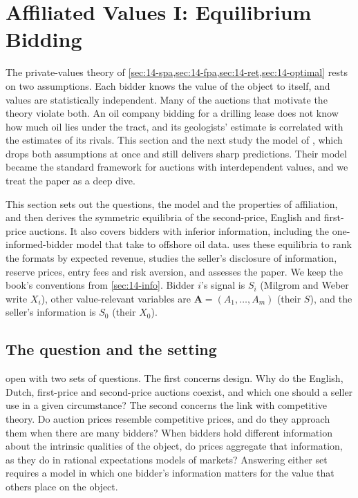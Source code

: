 \section{Affiliated Values I: Equilibrium Bidding}\label{sec:14-mw-eq}

The private-values theory of \cref{sec:14-spa,sec:14-fpa,sec:14-ret,sec:14-optimal} rests on two
assumptions. Each bidder knows the value of the object to itself, and values are statistically independent.
Many of the auctions that motivate the theory violate both. An oil company bidding for a drilling lease does
not know how much oil lies under the tract, and its geologists' estimate is correlated with the estimates of
its rivals. This section and the next study the model of \citet{MilgromWeber1982}, which drops both
assumptions at once and still delivers sharp predictions. Their model became the standard framework for
auctions with interdependent values, and we treat the paper as a deep dive.

This section sets out the questions, the model and the properties of affiliation, and then derives the
symmetric equilibria of the second-price, English and first-price auctions. It also covers bidders with
inferior information, including the one-informed-bidder model that \citet{HendricksPorter1988} take to
offshore oil data.  uses these equilibria to rank the formats by expected revenue,
studies the seller's disclosure of information, reserve prices, entry fees and risk aversion, and assesses
the paper. We keep the book's conventions from \cref{sec:14-info}. Bidder $i$'s signal is $S_i$ (Milgrom and
Weber write $X_i$), other value-relevant variables are $\bm A=(A_1,\dots,A_m)$ (their $S$), and the seller's
information is $S_0$ (their $X_0$).

\subsection{The question and the setting}\label{sec:14-mw-question}

\citet[pp.~1089--1090]{MilgromWeber1982} open with two sets of questions. The first concerns design. Why do
the English, Dutch, first-price and second-price auctions coexist, and which one should a seller use in a
given circumstance? The second concerns the link with competitive theory. Do auction prices resemble
competitive prices, and do they approach them when there are many bidders? When bidders hold different
information about the intrinsic qualities of the object, do prices aggregate that information, as they do in
rational expectations models of markets? Answering either set requires a model in which one bidder's
information matters for the value that others place on the object.

